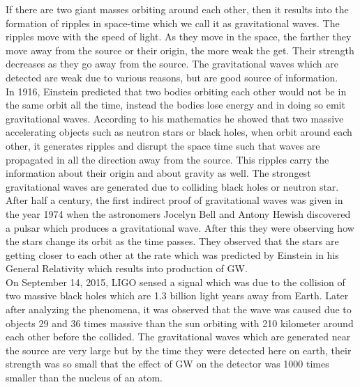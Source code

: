 If there are two giant masses orbiting around each other, then it results into the formation of ripples in space-time which we call it as gravitational waves. The ripples move with the speed of light. As they move in the space, the farther they move away from the source or their origin, the more weak the get. Their strength decreases as they go away from the source. The gravitational waves which are detected are weak due to various reasons, but are good source of information.\\ In 1916, Einstein predicted that two bodies orbiting each other would not be in the same orbit all the time, instead the bodies lose energy and in doing so emit gravitational waves. According to his mathematics he showed that two massive accelerating objects such as neutron stars or black holes, when orbit around each other, it generates ripples and disrupt the space time such that waves are propagated in all the direction away from the source. This ripples carry the information about their origin and about gravity as well. The strongest gravitational waves are generated due to colliding black holes or neutron star. After half a century, the first indirect proof of gravitational waves was given in the year 1974 when the astronomers Jocelyn Bell and Antony Hewish discovered a pulsar which produces a gravitational wave. After this they were observing how the stars change its orbit as the time passes. They observed that the stars are getting closer to each other at the rate which was predicted by Einstein in his General Relativity which results into production of GW.\\ On September 14, 2015, LIGO sensed a signal which was due to the collision of two massive black holes which are 1.3 billion light years away from Earth. Later after analyzing the phenomena, it was observed that the wave was caused due to objects 29 and 36 times massive than the sun orbiting with 210 kilometer around each other before the collided. The gravitational waves which are generated near the source are very large but by the time they were detected here on earth, their strength was so small that the effect of GW on the detector was 1000 times smaller than the nucleus of an atom.

\pagebreak

